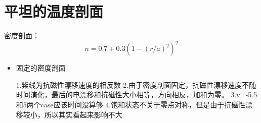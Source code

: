 \documentclass[11pt,a4paper]{article}
\begin{document}
\section{平坦的温度剖面}
密度剖面：
$$ n = 0.7 + 0.3(1-(r/a)^2)^2 $$
\begin{itemize}
	\item 固定的密度剖面
	\begin{figure}[H]
		\centering
		\caption{}		
	\end{figure}
	1.紫线为抗磁性漂移速度的相反数
	2.由于密度剖面固定，抗磁性漂移速度不随时间演化，最后的电漂移和抗磁性大小相等，方向相反，加和为零。
	3.v=-5.5和5两个case应该时间没算够
	4.饱和状态不关于零点对称，但是由于抗磁性漂移较小，所以其实看起来影响不大


\end{itemize}
\end{document}
